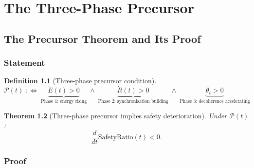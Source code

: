 \documentclass[11pt,a4paper,openany]{book}
\newtheorem{theorem}{Theorem}[chapter]
\theoremstyle{definition}
\newtheorem{definition}[theorem]{Definition}
\begin{document}
\part{The Three-Phase Precursor}

\chapter{The Precursor Theorem and Its Proof}

\section{Statement}

\begin{definition}[Three-phase precursor condition]
\[
\mathcal{P}(t) \;:\iff\;
\underbrace{\dot E(t) > 0}_{\text{Phase 1: energy rising}}
\;\wedge\;
\underbrace{\dot R(t) > 0}_{\text{Phase 2: synchronisation building}}
\;\wedge\;
\underbrace{\ddot\theta_t > 0}_{\text{Phase 3: decoherence accelerating}}
\]
\end{definition}

\begin{theorem}[Three-phase precursor implies safety deterioration]
\label{thm:precursor}
Under $\mathcal{P}(t)$:
\[
\frac{d}{dt}\mathrm{SafetyRatio}(t) < 0.
\]
\end{theorem}

\section{Proof}
\end{document}
